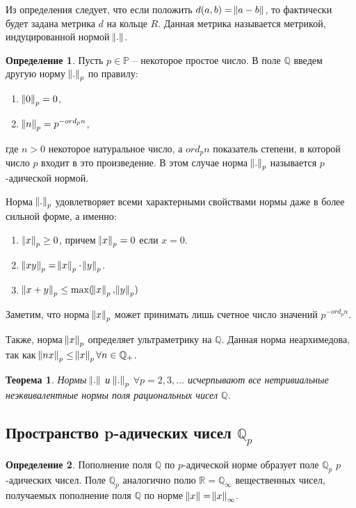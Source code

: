 \documentclass[master, och, diploma, times]{sty/SCWorks}
\theoremstyle{plain}
\newtheorem{thethm}{Теорема}[section]
\theoremstyle{definition}
\newtheorem{defn}{Определение}[section]
\begin{document}
Из определения следует, что если положить $d(a, b)= \norm{a - b}$, то фактически будет задана метрика $d$ на кольце $R$. Данная метрика называется метрикой, индуцированной нормой $\norm{.}$.

\begin{defn}
Пусть $p \in \mathbb {P}$ -- некоторое простое число. В поле $\mathbb {Q}$ введем другую норму $\norm{.}_p$ по правилу:

\begin{enumerate} 
	\item $\norm{0}_p = 0$,
	\item $\norm{n}_p = p ^ {-ord_pn}$,
\end{enumerate}

\noindent где $n > 0$ некоторое натуральное число, а $ord_pn$ показатель степени, в которой число $p$ входит в это произведение. В этом случае норма $\norm{.}_p$ называется $p$-адической нормой.
\end{defn}

Норма $\norm{.}_p$  удовлетворяет всеми характерными свойствами нормы даже в более сильной форме, а именно:

\begin{enumerate} 
	\item $\norm{x}_p \ge 0$, причем $\norm{x}_p = 0$ если $x = 0$.
	\item $\norm{xy}_p = \norm{x}_p \cdot \norm{y}_p$.
	\item $\norm{x + y}_p \le \max(\norm{x}_p, \norm{y}_p)$ \cite{bib:analysis:volovich}
\end{enumerate}

Заметим, что норма $\norm{x}_p$ может принимать лишь счетное число значений $p ^ {-ord_pn}$.

Также, норма $\norm{x}_p$ определяет ультраметрику на $\mathbb {Q}$. Данная норма неархимедова, так как $\norm{nx}_p \le \norm{x}_p \forall n \in \mathbb {Q}_{+}$.

\begin{thethm}
	Нормы $\norm{.}$ и $\norm{.}_p$ $\forall p = 2, 3, \dots$ исчерпывают все нетривиальные неэквивалентные нормы поля рациональных чисел $\mathbb {Q}$.
\end{thethm}


\subsection{Пространство p-адических чисел $\mathbb {Q}_p$}

\begin{defn}
Пополнение поля $\mathbb {Q}$ по $p$-адической норме образует поле $\mathbb {Q}_p$ $p$-адических чисел. Поле $\mathbb {Q}_p$ аналогично полю $\mathbb {R} = \mathbb {Q}_{\infty}$ вещественных чисел, получаемых пополнение поля $\mathbb {Q}$ по норме $\norm{x}=\norm{x}_{\infty}$.
\end{defn}
\end{document}

